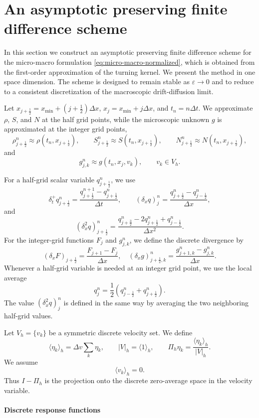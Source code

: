 \documentclass[11pt,twoside]{article}
\theoremstyle{plain}
\theoremstyle{nonumberplain}
\begin{document}
{\color{red}
\section{An asymptotic preserving finite difference scheme}
\label{sec:scheme}

In this section we construct an asymptotic preserving finite difference
scheme for the micro-macro formulation \eqref{eq:micro-macro-normalized},
which is obtained from the first-order approximation of the turning
kernel. We present the method in one space dimension. The scheme is
designed to remain stable as \(\varepsilon\to0\) and to reduce to a
consistent discretization of the macroscopic drift-diffusion limit.

Let \(x_{j+\frac12}=x_{\min}+(j+\frac12)\Delta x\),
\(x_j=x_{\min}+j\Delta x\), and \(t_n=n\Delta t\). We approximate
\(\rho\), \(S\), and \(N\) at the half grid points, while the microscopic
unknown \(g\) is approximated at the integer grid points,
\[
\rho_{j+\frac12}^n\approx \rho(t_n,x_{j+\frac12}),\qquad
S_{j+\frac12}^n\approx S(t_n,x_{j+\frac12}),\qquad
N_{j+\frac12}^n\approx N(t_n,x_{j+\frac12}),
\]
and
\[
g_{j,k}^n\approx g(t_n,x_j,v_k),\qquad v_k\in V_h .
\]

For a half-grid scalar variable \(q_{j+\frac12}^n\), we use
\[
\delta_t^+ q_{j+\frac12}^n
=
\frac{q_{j+\frac12}^{n+1}-q_{j+\frac12}^n}{\Delta t},
\qquad
(\delta_x q)_j^n
=
\frac{q_{j+\frac12}^n-q_{j-\frac12}^n}{\Delta x},
\]
and
\[
(\delta_x^2 q)_{j+\frac12}^n
=
\frac{
q_{j+\frac32}^n
-2q_{j+\frac12}^n
+q_{j-\frac12}^n
}{\Delta x^2}.
\]
For the integer-grid functions \(F_j\) and \(g_{j,k}^n\), we define the discrete divergence by
\[
(\delta_x F)_{j+\frac12}
=
\frac{F_{j+1}-F_j}{\Delta x},
\quad 
(\delta_x g)_{j+\frac12,k}^n
=
\frac{g_{j+1,k}^n-g_{j,k}^n}{\Delta x}.
\]
Whenever a half-grid variable is needed at an integer grid point, we use
the local average
\[
q_j^n=\frac12\left(q_{j-\frac12}^n+q_{j+\frac12}^n\right).
\]
The value \((\delta_x^2 q)_j^n\) is defined in the same way by averaging
the two neighboring half-grid values.

Let \(V_h=\{v_k\}\) be a symmetric discrete velocity set. We define
\[
\langle \eta_k\rangle_h=\Delta v\sum_k \eta_k,
\qquad
|V|_h=\langle 1\rangle_h,
\qquad
\Pi_h\eta_k=\frac{\langle \eta_k\rangle_h}{|V|_h}.
\]
We assume
\[
\langle v_k\rangle_h=0.
\]
Thus \(I-\Pi_h\) is the projection onto the discrete zero-average space in
the velocity variable.

\paragraph{Discrete response functions}

}
\end{document}
